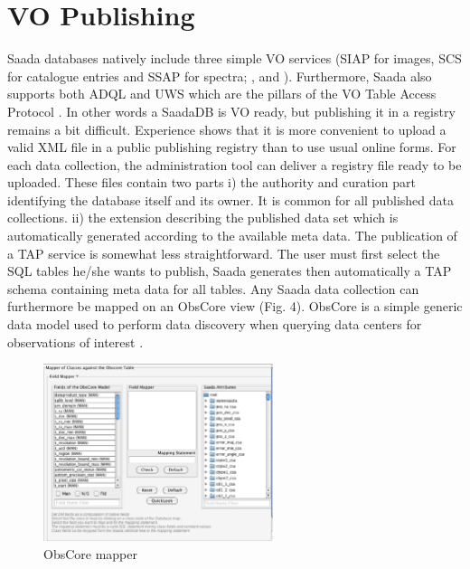 \documentclass[11pt,twoside]{article}
\begin{document}

\section{VO Publishing}
Saada databases natively include three simple VO services (SIAP for images, SCS for catalogue entries and SSAP for spectra; \cite{SIAP} , \cite{SCS} and \cite{SSAP} ). Furthermore, Saada also supports both ADQL \citep{ADQL} and UWS \citep{UWS} which are the pillars of the VO Table Access Protocol \citep{TAP} .
In other words a SaadaDB is VO ready, but publishing it in a registry \citep{REG} remains a bit difficult. Experience shows that it is more convenient to upload a valid XML file in a public publishing registry than to use usual online forms. For each data collection, the administration tool can deliver a registry file ready to be uploaded. These files contain two parts i) the authority and curation part identifying the database itself and its owner. It is common for all published data collections. ii) the extension describing the published data set which is automatically generated according to the available meta data.
The publication of a TAP service is somewhat less straightforward. The user must first select the SQL tables he/she wants to publish, Saada generates then automatically a TAP schema containing meta data for all tables. 
Any Saada data collection can furthermore be mapped on an ObsCore view (Fig. 4). ObsCore  is a simple generic data model used to perform data discovery when querying data centers for observations of interest \citep{OBSCORE}.


\begin{figure}[!h]
	\begin{center}
		\includegraphics[width=0.60\textwidth]{P18_fig4.eps}
	\end{center}
	\caption{ObsCore mapper}
	\label{fig:fig4}
\end{figure}
\end{document}
